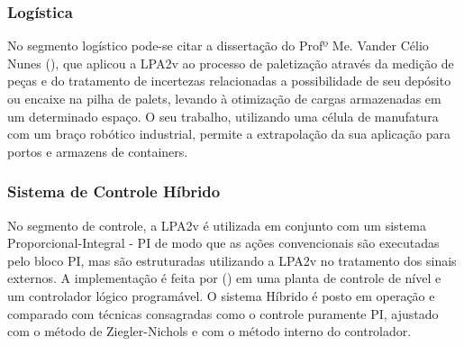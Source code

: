 \subsubsection{Logística}

No segmento logístico pode-se citar a dissertação do 
Profº Me. Vander Célio Nunes (\cite{Vander}), 
que aplicou a LPA2v ao processo de paletização 
através da medição de peças e do tratamento de incertezas 
relacionadas a possibilidade de seu depósito ou encaixe na pilha de palets, 
levando à otimização de cargas armazenadas em um determinado espaço. 
O seu trabalho, utilizando uma célula de manufatura 
com um braço robótico industrial, 
permite a extrapolação da sua aplicação para portos e armazens de containers.


\subsubsection{Sistema de Controle Híbrido}

No segmento de controle, a LPA2v é utilizada em conjunto com um 
sistema Proporcional-Integral - PI de modo que 
as ações convencionais são executadas pelo bloco PI, 
mas são estruturadas utilizando a LPA2v no 
tratamento dos sinais externos. 
A implementação é feita por 
\citeauthor{Marcelo}(\citeyear{Marcelo}) 
em uma planta de controle de nível e um
controlador lógico programável. 
O sistema Híbrido é posto em operação e 
comparado com técnicas consagradas como o 
controle puramente PI, ajustado com o
método de Ziegler-Nichols e com o 
método interno do controlador. 















